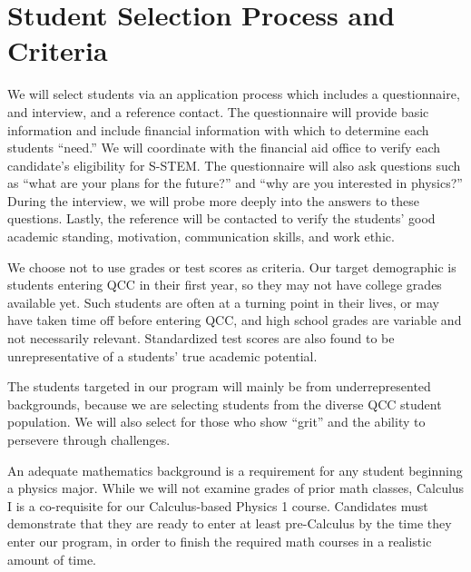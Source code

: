 \documentclass[12pt]{article}
\begin{document}
\section{Student Selection Process and Criteria}
We will select students via an application process which includes a questionnaire, and interview, and a reference contact.  The questionnaire will provide basic information and include financial information with which to determine each students ``need.''  We will coordinate with the financial aid office to verify each candidate's eligibility for S-STEM.  The questionnaire will also ask questions such as ``what are your plans for the future?'' and ``why are you interested in physics?''  During the interview, we will probe more deeply into the answers to these questions.  Lastly, the reference will be contacted to verify the students' good academic standing, motivation, communication skills, and work ethic.

We choose not to use grades or test scores as criteria.  Our target demographic is students entering QCC in their first year, so they may not have college grades available yet.  Such students are often at a turning point in their lives, or may have taken time off before entering QCC, and high school grades are variable and not necessarily relevant.  Standardized test scores are also found to be unrepresentative of a students' true academic potential.

The students targeted in our program will mainly be from underrepresented backgrounds, because we are selecting students from the diverse QCC  student population.  We will also select for those who show ``grit'' and the ability to persevere through challenges.  

An adequate mathematics background is a requirement for any student beginning a physics major.  While we will not examine grades of prior math classes, Calculus I is a co-requisite for our Calculus-based Physics 1 course.  Candidates must demonstrate that they are ready to enter at least pre-Calculus by the time they enter our program, in order to finish the required math courses in a realistic amount of time.


\end{document}
